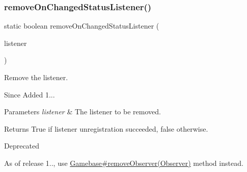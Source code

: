 \subsubsection{\texorpdfstring{remove\+On\+Changed\+Status\+Listener()}{removeOnChangedStatusListener()}}
{\footnotesize\ttfamily static boolean remove\+On\+Changed\+Status\+Listener (\begin{DoxyParamCaption}\item[{final Network\+Manager.\+On\+Changed\+Status\+Listener}]{listener }\end{DoxyParamCaption})\hspace{0.3cm}{\ttfamily [static]}}



Remove the listener. 

\begin{DoxySince}{Since}
Added 1... 
\end{DoxySince}

\begin{DoxyParams}{Parameters}
{\em listener} & The listener to be removed. \\
\hline
\end{DoxyParams}
\begin{DoxyReturn}{Returns}
True if listener unregistration succeeded, false otherwise. 
\end{DoxyReturn}
\begin{DoxyRefDesc}{Deprecated}
\item[\hyperlink{deprecated__deprecated000007}{Deprecated}]As of release 1.., use \hyperlink{classcom_1_1toast_1_1android_1_1gamebase_1_1_gamebase_af13c08393910fc1b5dac3b5209f461c8}{Gamebase\#remove\+Observer(\+Observer)} method instead. \end{DoxyRefDesc}
